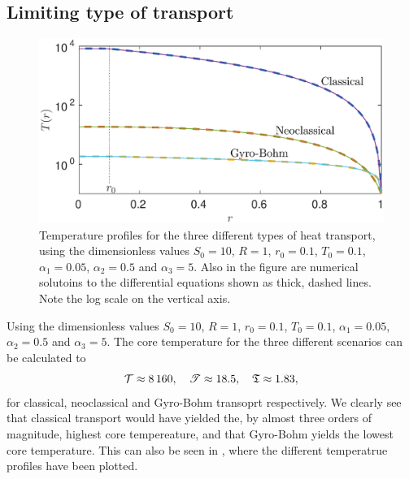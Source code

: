 \documentclass[11pt,a4paper, 
swedish, english %
]{article}
\begin{document}
\subsection*{Limiting type of transport}
\begin{figure}
\centering\vspace{-1.9cm}
\includegraphics[width=12cm]{Q2.eps}
\caption{Temperature profiles for the three different types of heat
  transport, using the dimensionless values $S_0=10$, $R=1$,
  $r_0=0.1$, $T_0=0.1$, $\alpha_1=0.05$, $\alpha_2=0.5$ and
  $\alpha_3=5$. Also in the figure are numerical solutoins to the
  differential equations shown as thick, dashed lines. Note the log
  scale on the vertical axis.}
\label{fig:transp}
\end{figure}

Using the dimensionless values $S_0=10$, $R=1$, $r_0=0.1$, $T_0=0.1$,
$\alpha_1=0.05$, $\alpha_2=0.5$ and $\alpha_3=5$. The core temperature
for the three different scenarios can be calculated to
\begin{equation}
\mathcal{T}\approx8\,160\qc
\mathscr{T}\approx18.5\qc
\mathfrak{T}\approx1.83,
\end{equation}
for classical, neoclassical and Gyro-Bohm transoprt
respectively. We clearly see that classical transport would have
yielded the, by almost three orders of magnitude, highest core
tempereature, and that Gyro-Bohm yields the lowest core
temperature. This can also be seen in , where the
different temperatrue profiles have been plotted. 
\end{document}
